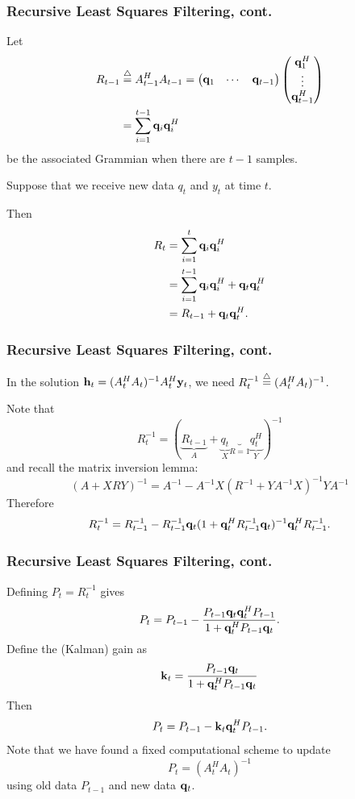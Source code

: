 \documentclass{beamer}
\begin{document}
\begin{frame}\frametitle{Recursive Least Squares Filtering, cont.}
	Let 
	\begin{align*}
		R_{t-1} &\stackrel{\triangle}{=} A^H_{t-1} A_{t-1} 
		     = \begin{pmatrix}\mathbf{q}_1 & \cdots & \mathbf{q}_{t-1}\end{pmatrix} \begin{pmatrix} \mathbf{q}^H_1 \\ \vdots \\ \mathbf{q}^H_{t-1} \end{pmatrix} \\
		    &= \sum_{i=1}^{t-1} \mathbf{q}_i \mathbf{q}^H_i
	\end{align*}
	be the associated Grammian when there are $t-1$ samples.  
	
	\vfill
	
	Suppose that we receive new data $q_t$ and $y_t$ at time $t$.
	
	\vfill
	
	Then 
	\begin{align*}
		R_t &= \sum_{i=1}^{t} \mathbf{q}_i \mathbf{q}^H_i \\
		    &= \sum_{i=1}^{t-1} \mathbf{q}_i \mathbf{q}^H_i  + \mathbf{q}_t \mathbf{q}_t^H \\
		    &= R_{t-1} + \mathbf{q}_t \mathbf{q}_t^H.
	\end{align*}
\end{frame}

\begin{frame}\frametitle{Recursive Least Squares Filtering, cont.}
	In the solution $\mathbf{h}_t = (A_t^H A_t)^{-1} A_t^H \mathbf{y}_t$, we need $R_t^{-1} \stackrel{\triangle}{=} (A_t^H A_t)^{-1}$.
	
	Note that 
		\[R_t^{-1} = (\underbrace{R_{t-1}}_{A} + \underbrace{q_t}_{X}\underbrace{}_{R=1}\underbrace{q_t^H}_{Y})^{-1}\] 
	and recall the matrix inversion lemma:
		\[ (A + XRY)^{-1} = A^{-1} - A^{-1}X(R^{-1}+YA^{-1}X)^{-1}YA^{-1} \]
	Therefore
		\[R_t^{-1} = R_{t-1}^{-1} - R^{-1}_{t-1} \mathbf{q}_t(1 + \mathbf{q}_t^H R^{-1}_{t-1} \mathbf{q}_t)^{-1}\mathbf{q}_t^H R^{-1}_{t-1}.\]
\end{frame}

\begin{frame}\frametitle{Recursive Least Squares Filtering, cont.}

	Defining $P_t = R_t^{-1}$ gives
		\[
		P_t = P_{t-1} - \frac{P_{t-1} \mathbf{q}_t \mathbf{q}_t^H P_{t-1}}{1 + \mathbf{q}_t^H P_{t-1} \mathbf{q}_t}.
		\]
	Define the (Kalman) gain as
		\[ 
		\mathbf{k}_t = \frac{P_{t-1} \mathbf{q}_t}{1 + \mathbf{q}_t^H P_{t-1} \mathbf{q}_t}
		\]
	Then
	\[ 
	P_t = P_{t-1} - \mathbf{k}_t \mathbf{q}_t^H P_{t-1}. 
	\]
	Note that we have found a fixed computational scheme to update
	\[
	P_t = (A_t^H A_t)^{-1} 
	\]
	using old data $P_{t-1}$ and new data $\mathbf{q}_t$.
\end{frame}
\end{document}
